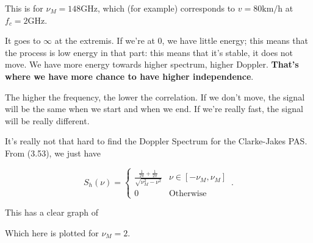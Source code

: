 \documentclass[a4paper, 12pt]{book}
\begin{document}
This is for $\nu_M = 148\text{GHz}$, which (for example) corresponds to $v = 80\text{km/h}$ at $f_c = 2\text{GHz}$.

It goes to $\infty$ at the extremis.
If we're at 0, we have little energy; this means that the process is low energy in that part: this means that it's stable, it does not move. We have more energy towards higher spectrum, higher Doppler. \textbf{That's where we have more chance to have higher independence}.

\begin{greenbar}
The higher the frequency, the lower the correlation.
If we don't move, the signal will be the same when we start and when we end. If we're really fast, the signal will be really different.
\end{greenbar}

\begin{purplebox}
It's really not that hard to find the Doppler Spectrum for the Clarke-Jakes PAS.
From (3.53), we just have

\[
S_h(\nu) = \begin{cases}
\frac{\frac{1}{2\pi} + \frac{1}{2\pi}}{\sqrt{\nu_M^2 - \nu^2}} & \nu \in [-\nu_M, \nu_M] \\
0 & \text{Otherwise}
\end{cases} \,.
\]

This has a clear graph of

\begin{center}
\end{center}

Which here is plotted for $\nu_M = 2$.
\end{purplebox}
\end{document}
